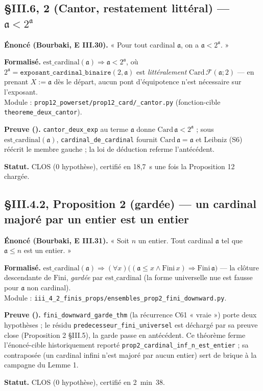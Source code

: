\subsection{§III.6, \theoreme{} 2 (Cantor, restatement littéral) --- $\mathfrak{a} < 2^{\mathfrak{a}}$}
\textbf{Énoncé (Bourbaki, E III.30).} « Pour tout cardinal $\mathfrak{a}$, on a
$\mathfrak{a} < 2^{\mathfrak{a}}$. »

\textbf{Formalisé.} $\mathrm{est\_cardinal}(\mathfrak{a}) \Rightarrow
\mathfrak{a} < 2^{\mathfrak{a}}$, où $2^{\mathfrak{a}} =
\texttt{exposant\_cardinal\_binaire}(2, \mathfrak{a})$ est \emph{littéralement}
$\mathrm{Card}\,\mathcal{F}(\mathfrak{a}; 2)$ --- en prenant $X := \mathfrak{a}$
dès le départ, aucun pont d'équipotence n'est nécessaire sur l'exposant. \\
Module : \texttt{prop12\_powerset/prop12\_card/\_cantor.py}
(fonction-cible \texttt{theoreme\_deux\_cantor}).

\textbf{Preuve (\Nstar).} \texttt{cantor\_deux\_exp} au terme $\mathfrak{a}$ donne
$\mathrm{Card}\,\mathfrak{a} < 2^{\mathfrak{a}}$ ; sous
$\mathrm{est\_cardinal}(\mathfrak{a})$, \texttt{cardinal\_de\_cardinal} fournit
$\mathrm{Card}\,\mathfrak{a} = \mathfrak{a}$ et Leibniz (S6) réécrit le membre
gauche ; la loi de déduction referme l'antécédent.

\textbf{Statut.} CLOS (0 hypothèse), certifié en 18,7~s une fois la Proposition 12
chargée.

\subsection{§III.4.2, Proposition 2 (gardée) --- un cardinal majoré par un entier est un entier}
\textbf{Énoncé (Bourbaki, E III.31).} « Soit $n$ un entier. Tout cardinal
$\mathfrak{a}$ tel que $\mathfrak{a} \le n$ est un entier. »

\textbf{Formalisé.} $\mathrm{est\_cardinal}(\mathfrak{a}) \Rightarrow
(\forall x)\bigl((\mathfrak{a} \le x \wedge \mathrm{Fini}\,x) \Rightarrow
\mathrm{Fini}\,\mathfrak{a}\bigr)$ --- la clôture descendante de $\mathrm{Fini}$,
\emph{gardée} par $\mathrm{est\_cardinal}$ (la forme universelle nue est fausse
pour $\mathfrak{a}$ non cardinal). \\
Module : \texttt{iii\_4\_2\_finis\_props/ensembles\_prop2\_fini\_downward.py}.

\textbf{Preuve (\Nstar).} \texttt{fini\_downward\_garde\_thm} (la récurrence C61
« vraie ») porte deux hypothèses ; le résidu \texttt{predecesseur\_fini\_universel}
est déchargé par sa preuve close (Proposition 2 §III.5), la garde passe en
antécédent. Ce théorème ferme l'énoncé-cible historiquement reporté
\texttt{prop2\_cardinal\_inf\_n\_est\_entier} ; sa contraposée (un cardinal infini
n'est majoré par aucun entier) sert de brique à la campagne du Lemme 1.

\textbf{Statut.} CLOS (0 hypothèse), certifié en 2~min~38.
